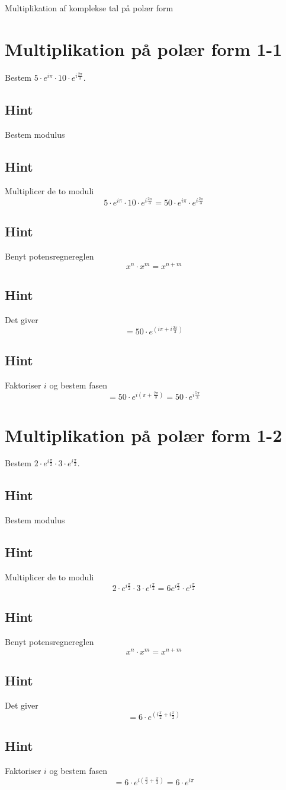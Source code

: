 \documentclass{article}
\newenvironment{exercise}[1]{\newpage\section{#1}}{}
\newcommand{\answerbox}[1]{\fbox{$#1$}}
\newcommand{\hint}{\subsection*{Hint}}
\begin{document}
Multiplikation af komplekse tal på polær form
\tableofcontents
\newpage

\begin{exercise}{Multiplikation på polær form 1-1}

Bestem $5 \cdot e^{i \pi} \cdot 10 \cdot e^{i \frac{2 \pi}{3}}$.

\answerbox{50 \cdot e^{i \frac{5\pi }{3}}}


\hint 

Bestem modulus


\hint

Multiplicer de to moduli 
\[
5 \cdot e^{i \pi} \cdot 10 \cdot e^{i \frac{2 \pi}{3}} = 50 \cdot e^{i \pi} \cdot e^{i \frac{2 \pi}{3}}
\]

\hint 

Benyt potensregnereglen
\[
x^n \cdot x^m = x^{n+m}
\]

\hint

Det giver
\[
=50 \cdot e^{(i \pi +i \frac{2 \pi}{3})} 
\]

\hint

Faktoriser $i$ og bestem fasen
\[
= 50 \cdot e^{i( \pi +\frac{2 \pi}{3})}  = 50 \cdot e^{i \frac{5\pi }{3}}
\]


\end{exercise}

\newpage

\begin{exercise}{Multiplikation på polær form 1-2}
	
	Bestem $2 \cdot e^{i \frac{\pi}{2}} \cdot 3 \cdot e^{i \frac{\pi}{2}}$.
	
	\answerbox{6 \cdot e^{i \pi}}
	
	
	\hint 
	
	Bestem modulus
	
	
	\hint
	
	Multiplicer de to moduli 
	\[
	2 \cdot e^{i \frac{\pi}{2}} \cdot 3 \cdot e^{i \frac{\pi}{2}} = 6 e^{i \frac{\pi}{2}} \cdot e^{i \frac{\pi}{2}}
	\]
	
	\hint 
	
	Benyt potensregnereglen
	\[
	x^n \cdot x^m = x^{n+m}
	\]
	
	\hint
	
	Det giver
	\[
	= 6 \cdot e^{(i \frac{\pi}{2}+ i \frac{\pi}{2})}
	\]
	
	\hint
	
	Faktoriser $i$ og bestem fasen
	\[
	= 6 \cdot e^{i( \frac{\pi}{2}+\frac{\pi}{2})} = 6 \cdot e^{i \pi}
	\]
	
	
\end{exercise}
\end{document}
